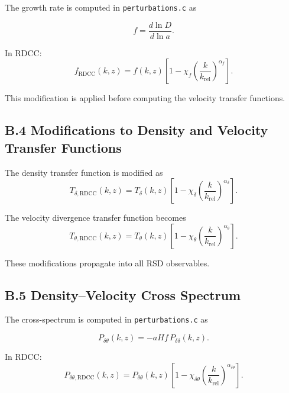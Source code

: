 \documentclass[11pt,a4paper]{article}
\begin{document}
The growth rate is computed in \texttt{perturbations.c} as


\[
f = \frac{d\ln D}{d\ln a}.
\]



In RDCC:
\begin{equation}
f_{\mathrm{RDCC}}(k,z)
=
f(k,z)
\left[
1
-
\chi_{f}
\left(
\frac{k}{k_{\mathrm{rel}}}
\right)^{\alpha_{f}}
\right].
\end{equation}

This modification is applied before computing the velocity transfer functions.

\subsection*{B.4 Modifications to Density and Velocity Transfer Functions}

The density transfer function is modified as
\begin{equation}
T_{\delta,\mathrm{RDCC}}(k,z)
=
T_{\delta}(k,z)
\left[
1
-
\chi_{\delta}
\left(
\frac{k}{k_{\mathrm{rel}}}
\right)^{\alpha_{\delta}}
\right].
\end{equation}

The velocity divergence transfer function becomes
\begin{equation}
T_{\theta,\mathrm{RDCC}}(k,z)
=
T_{\theta}(k,z)
\left[
1
-
\chi_{\theta}
\left(
\frac{k}{k_{\mathrm{rel}}}
\right)^{\alpha_{\theta}}
\right].
\end{equation}

These modifications propagate into all RSD observables.

\subsection*{B.5 Density–Velocity Cross Spectrum}

The cross-spectrum is computed in \texttt{perturbations.c} as


\[
P_{\delta\theta}(k,z) = -aHf\,P_{\delta\delta}(k,z).
\]



In RDCC:
\begin{equation}
P_{\delta\theta,\mathrm{RDCC}}(k,z)
=
P_{\delta\theta}(k,z)
\left[
1
-
\chi_{\delta\theta}
\left(
\frac{k}{k_{\mathrm{rel}}}
\right)^{\alpha_{\delta\theta}}
\right].
\end{equation}
\end{document}
